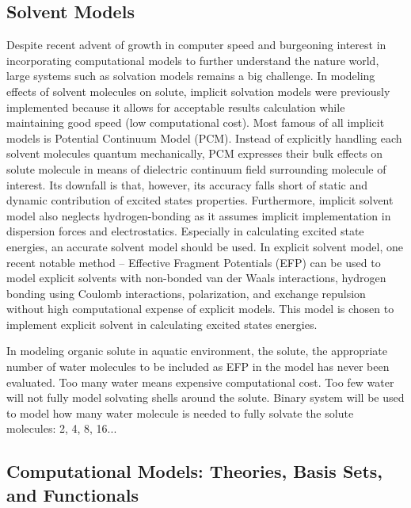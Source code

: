 \documentclass[
journal=jacsat, %
manuscript=article]{achemso}
\begin{document}
\subsection{Solvent Models}

Despite recent advent of growth in computer speed and burgeoning interest in incorporating computational models to further understand the nature world, large systems such as solvation models remains a big challenge.\cite{Lin2007} In modeling effects of solvent molecules on solute, implicit solvation models were previously implemented because it allows for acceptable results calculation while maintaining good speed (low computational cost). Most famous of all implicit models is Potential Continuum Model (PCM).\cite{Cossi2000} Instead of explicitly handling each solvent molecules quantum mechanically, PCM expresses their bulk effects on solute molecule in means of dielectric continuum field surrounding molecule of interest. Its downfall is that, however, its accuracy falls short of static and dynamic contribution of excited states properties.\cite{Barone2007} Furthermore, implicit solvent model also neglects hydrogen-bonding as it assumes implicit implementation in dispersion forces and electrostatics.\cite{Li1999} Especially in calculating excited state energies, an accurate solvent model should be used.\cite{Tomasi2005} In explicit solvent model, one recent notable method – Effective Fragment Potentials (EFP) can be used to model explicit solvents with non-bonded van der Waals interactions, hydrogen bonding using Coulomb interactions, polarization, and exchange repulsion without high computational expense of explicit models.\cite{Day1996,Yoo2008} This model is chosen to implement explicit solvent in calculating excited states energies.

In modeling organic solute in aquatic environment, the solute,  the appropriate number of water molecules to be included as EFP in the model has never been evaluated. Too many water means expensive computational cost. Too few water will not fully model solvating shells around the solute. Binary system will be used to model how many water molecule is needed to fully solvate the solute molecules: 2, 4, 8, 16... 

\subsection{Computational Models: Theories, Basis Sets, and Functionals}
\end{document}
